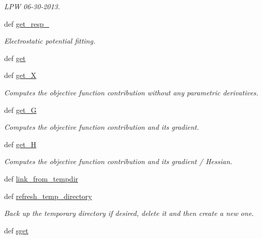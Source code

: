 \begin{DoxyCompactItemize}
\begin{DoxyCompactList}\small\item\em L\-P\-W 06-\/30-\/2013. \end{DoxyCompactList}\item 
def \hyperlink{classforcebalance_1_1abinitio_1_1AbInitio_abfe50569805218075c5942fd3be8bbe7}{get\-\_\-resp\-\_\-}
\begin{DoxyCompactList}\small\item\em Electrostatic potential fitting. \end{DoxyCompactList}\item 
def \hyperlink{classforcebalance_1_1abinitio_1_1AbInitio_a2bb3ed7209707f688ec8b731392466b5}{get}
\item 
def \hyperlink{classforcebalance_1_1target_1_1Target_a606dd136f195c267c05a2455405e5949}{get\-\_\-\-X}
\begin{DoxyCompactList}\small\item\em Computes the objective function contribution without any parametric derivatives. \end{DoxyCompactList}\item 
def \hyperlink{classforcebalance_1_1target_1_1Target_afa8cc38c8bba8861c072e789717aa049}{get\-\_\-\-G}
\begin{DoxyCompactList}\small\item\em Computes the objective function contribution and its gradient. \end{DoxyCompactList}\item 
def \hyperlink{classforcebalance_1_1target_1_1Target_a1d2ee27fe86a09769c1816af23b09adb}{get\-\_\-\-H}
\begin{DoxyCompactList}\small\item\em Computes the objective function contribution and its gradient / Hessian. \end{DoxyCompactList}\item 
def \hyperlink{classforcebalance_1_1target_1_1Target_a5aa4958cea0a48138511567a076c5a82}{link\-\_\-from\-\_\-tempdir}
\item 
def \hyperlink{classforcebalance_1_1target_1_1Target_afe815eafab06ac92f10bbf4b88ad95c8}{refresh\-\_\-temp\-\_\-directory}
\begin{DoxyCompactList}\small\item\em Back up the temporary directory if desired, delete it and then create a new one. \end{DoxyCompactList}\item 
def \hyperlink{classforcebalance_1_1target_1_1Target_a51d58b55242bf4d4909c1837174f5f3c}{sget}

\end{DoxyCompactItemize}
